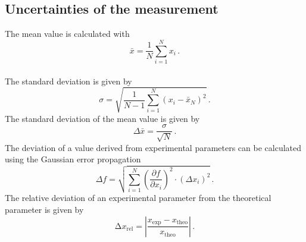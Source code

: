 \subsection{Uncertainties of the measurement}
\label{sec:fehlerrechnung}
The mean value is calculated with
\begin{equation}
\bar{x} = \frac{1}{N} \sum_{i=1}^{N} x_i \, .
\label{eqn:mittelwert}
\end{equation}
\\
The standard deviation is given by
\begin{equation}
\sigma = \sqrt{\frac{1}{N - 1} \sum_{i=1}^{N} \left( x_i - \bar{x}_N \right)^2} \, .
\label{eqn:standardabweichung}
\end{equation}
The standard deviation of the mean value is given by
\begin{equation}
\Delta \bar{x} = \frac{\sigma}{\sqrt{N}} \, .
\label{eqn:standardmittelwert}
\end{equation}
The deviation of a value derived from experimental parameters can be calculated using the Gaussian error propagation
\begin{equation*}
\Delta f = \sqrt{\sum_{i=1}^{N} \left( \frac{\partial f}{\partial x_i} \right)^2 \cdot (\Delta x_i)^2} \, .
\label{eqn:fehlerfortpflanzung}
\end{equation*}
The relative deviation of an experimental parameter from the theoretical parameter is given by~\cite{relabw}
\begin{equation}
    \increment x_{\mathrm{rel}} = \left| \frac{x_{\mathrm{\exp}}-x_{\mathrm{theo}}}{x_{\mathrm{theo}}}\right|\, .
    \label{eqn:relabw}
\end{equation}

